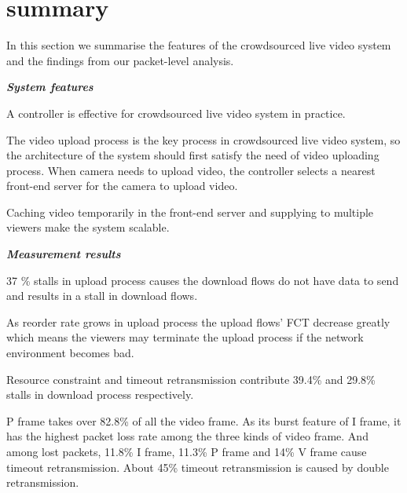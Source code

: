 
\section{summary}
\label{sec:summary}

In this section we summarise the features of the crowdsourced live video system and the findings from our packet-level analysis.

\textbf{\textit{System features}}
\squishlist

\item A controller is effective for crowdsourced live video system in practice.

\item The video upload process is the key process in crowdsourced live video system, so the architecture of the system should first satisfy the need of video uploading process. When camera needs to upload video, the controller selects a nearest front-end server for the camera to upload video.  

\item Caching video temporarily in the front-end server and supplying to multiple viewers make the system scalable. 


\textbf{\textit{Measurement results}}

\item 37 \% stalls in upload process causes the download flows do not have data to send and results in a stall in download flows.

\item As reorder rate grows in upload process the upload flows' FCT decrease greatly which means the viewers may terminate the upload process if the network environment becomes bad.

\item Resource constraint and timeout retransmission contribute 39.4\% and 29.8\% stalls in download process respectively. 

\item  P frame takes over 82.8\% of all the video frame. As its burst feature of I frame, it has the highest packet loss rate among the three kinds of video frame. And among  lost packets,  11.8\% I frame, 11.3\% P frame and 14\% V frame cause timeout retransmission. About 45\% timeout retransmission is caused by double retransmission. 
\squishend
 
